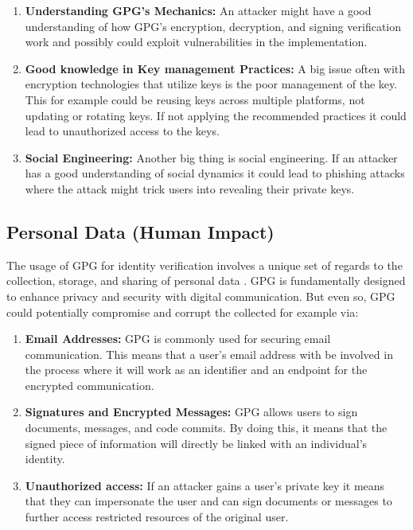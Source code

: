 \documentclass{article}
\begin{document}
\begin{enumerate}
    \item \textbf{Understanding GPG's Mechanics:} An attacker might have a good understanding of how GPG's encryption, decryption, and signing verification work and possibly could exploit vulnerabilities in the implementation. 
    \item \textbf{Good knowledge in Key management Practices:} A big issue often with encryption technologies that utilize keys is the poor management of the key. This for example could be reusing keys across multiple platforms, not updating or rotating keys. If not applying the recommended practices it could lead to unauthorized access to the keys.
    \item \textbf{Social Engineering:} Another big thing is social engineering. If an attacker has a good understanding of social dynamics it could lead to phishing attacks where the attack might trick users into revealing their private keys.
\end{enumerate}

\subsection{Personal Data (Human Impact)}
The usage of GPG for identity verification involves a unique set of regards to the collection, storage, and sharing of personal data \cite{WhatIsGP82:online}. GPG is fundamentally designed to enhance privacy and security with digital communication. But even so, GPG could potentially compromise and corrupt the collected for example via:

\begin{enumerate}
    \item \textbf{Email Addresses:} GPG is commonly used for securing email communication. This means that a user's email address with be involved in the process where it will work as an identifier and an endpoint for the encrypted communication.
    \item \textbf{Signatures and Encrypted Messages:} GPG allows users to sign documents, messages, and code commits. By doing this, it means that the signed piece of information will directly be linked with an individual's identity.
    \item \textbf{Unauthorized access:} If an attacker gains a user's private key it means that they can impersonate the user and can sign documents or messages to further access restricted resources of the original user.
\end{enumerate}

\newpage
\printbibliography
\end{document}
